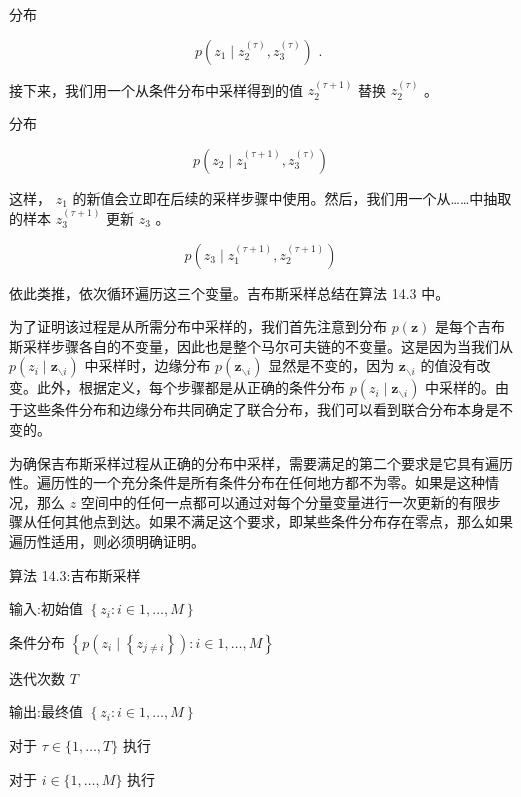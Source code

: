 \documentclass[10pt]{article}
\begin{document}
分布

\[
p\left( {{z}_{1} \mid  {z}_{2}^{\left( \tau \right) },{z}_{3}^{\left( \tau \right) }}\right) \text{ . } \tag{14.42}
\]

接下来，我们用一个从条件分布中采样得到的值 \({z}_{2}^{\left( \tau  + 1\right) }\) 替换 \({z}_{2}^{\left( \tau \right) }\) 。

分布

\[
p\left( {{z}_{2} \mid  {z}_{1}^{\left( \tau  + 1\right) },{z}_{3}^{\left( \tau \right) }}\right)  \tag{14.43}
\]

这样， \({z}_{1}\) 的新值会立即在后续的采样步骤中使用。然后，我们用一个从……中抽取的样本 \({z}_{3}^{\left( \tau  + 1\right) }\) 更新 \({z}_{3}\) 。

\[
p\left( {{z}_{3} \mid  {z}_{1}^{\left( \tau  + 1\right) },{z}_{2}^{\left( \tau  + 1\right) }}\right)  \tag{14.44}
\]

依此类推，依次循环遍历这三个变量。吉布斯采样总结在算法 14.3 中。

为了证明该过程是从所需分布中采样的，我们首先注意到分布 \(p\left( \mathbf{z}\right)\) 是每个吉布斯采样步骤各自的不变量，因此也是整个马尔可夫链的不变量。这是因为当我们从 \(p\left( {{z}_{i} \mid  {\mathbf{z}}_{\smallsetminus i}}\right)\) 中采样时，边缘分布 \(p\left( {\mathbf{z}}_{\smallsetminus i}\right)\) 显然是不变的，因为 \({\mathbf{z}}_{\smallsetminus i}\) 的值没有改变。此外，根据定义，每个步骤都是从正确的条件分布 \(p\left( {{z}_{i} \mid  {\mathbf{z}}_{\smallsetminus i}}\right)\) 中采样的。由于这些条件分布和边缘分布共同确定了联合分布，我们可以看到联合分布本身是不变的。

为确保吉布斯采样过程从正确的分布中采样，需要满足的第二个要求是它具有遍历性。遍历性的一个充分条件是所有条件分布在任何地方都不为零。如果是这种情况，那么 \(z\) 空间中的任何一点都可以通过对每个分量变量进行一次更新的有限步骤从任何其他点到达。如果不满足这个要求，即某些条件分布存在零点，那么如果遍历性适用，则必须明确证明。

算法 14.3:吉布斯采样

输入:初始值 \(\left\{  {{z}_{i} : i \in  1,\ldots ,M}\right\}\)

条件分布 \(\left\{  {p\left( {{z}_{i} \mid  \left\{  {z}_{j \neq  i}\right\}  }\right)  : i \in  1,\ldots ,M}\right\}\)

迭代次数 \(T\)

输出:最终值 \(\left\{  {{z}_{i} : i \in  1,\ldots ,M}\right\}\)

对于 \(\tau  \in  \{ 1,\ldots ,T\}\) 执行

对于 \(i \in  \{ 1,\ldots ,M\}\) 执行
\end{document}
